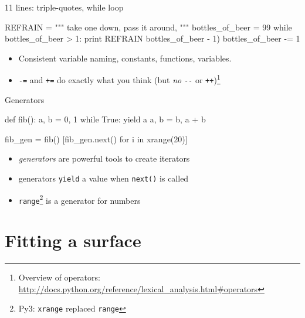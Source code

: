 \documentclass[xetex,10pt]{beamer}
\def\spacer{\vspace*{1em}}
\newcommand{\pypypy}[1]{\footnote[frame]{Py3: #1}}
\def\pythoni{\lstinline[language=pythontim]}
\begin{document}
\begin{frame}[fragile]{11 lines: triple-quotes, while loop }
	\begin{python}
REFRAIN = """
take one down, pass it around,
"""
bottles_of_beer = 99
while bottles_of_beer > 1:
    print REFRAIN %
        bottles_of_beer - 1)
    bottles_of_beer -= 1
\end{python}
	\spacer
	\pause
	\begin{itemize}
		\item Consistent variable naming, constants, functions, variables.
		\pause
		\item \pythoni{-=} and \pythoni{+=} do exactly what you think (but \emph{no} \pythoni{--} or \pythoni{++})\footnote[frame]{Overview of operators: \url{http://docs.python.org/reference/lexical_analysis.html\#operators}}
	\end{itemize}
\end{frame}

\begin{frame}[fragile]{Generators}
	\begin{python}
def fib():
    a, b = 0, 1
    while True:
        yield a
        a, b = b, a + b

fib_gen = fib()
[fib_gen.next() for i in xrange(20)]
\end{python}
	\spacer
	\pause
	\begin{itemize}
		\item \emph{generators} are powerful tools to create iterators
		\pause
		\item generators \pythoni{yield} a value when \pythoni{next()} is called
		\pause
		\item \pythoni{range}\pypypy{\pythoni{xrange} replaced \pythoni{range}} is a generator for numbers
	\end{itemize}
\end{frame}

\section{Fitting a surface}
\end{document}
